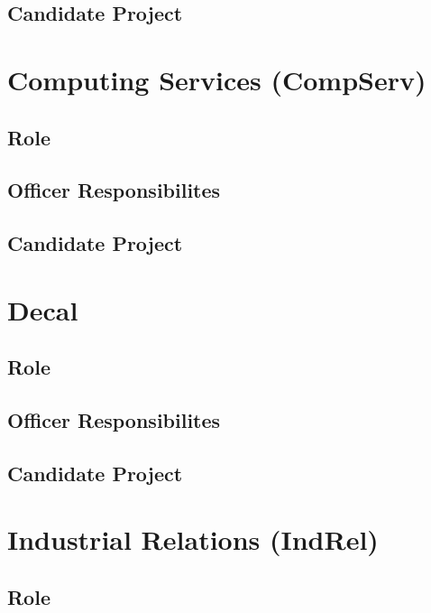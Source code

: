 \documentclass[11pt, article, oneside]{memoir}
\begin{document}
    \subsection{Candidate Project}

    \bigbreak


    \section{Computing Services (CompServ)}
    \subsection{Role}

    \subsection{Officer Responsibilites}

    \subsection{Candidate Project}

    \bigbreak

    
    \section{Decal}
    \subsection{Role}

    \subsection{Officer Responsibilites}

    \subsection{Candidate Project}

    \bigbreak

    
    \section{Industrial Relations (IndRel)}
    \subsection{Role}
\end{document}
